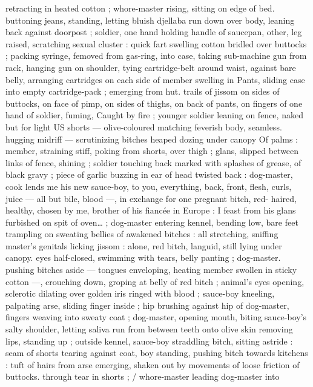 retracting in heated cotton ; whore-master rising, sitting on edge of 
bed. buttoning jeans, standing, letting bluish djellaba run down over 
body, leaning back against doorpost ; soldier, one hand holding 
handle of saucepan, other, leg raised, scratching sexual cluster : 
quick fart swelling cotton bridled over buttocks ; packing syringe, 
femoved from gas-ring, into case, taking sub-machine gun from rack, 
hanging gun on shoulder, tying cartridge-belt around waist, against 
bare belly, arranging cartridges on each side of member swelling in 
Pants, sliding case into empty cartridge-pack ; emerging from hut. 
trails of jissom on sides of buttocks, on face of pimp, on sides of 
thighs, on back of pants, on fingers of one hand of soldier, fuming, 
Caught by fire ; younger soldier leaning on fence, naked but for light 
US shorts --- olive-coloured matching feverish body, seamless. 
hugging midriff --- scrutinizing bitches heaped dozing under canopy 
Of palms : member, straining stiff, poking from shorts, over thigh ; 
glans, slipped between links of fence, shining ; soldier touching back 
marked with splashes of grease, of black gravy ; piece of garlic 
buzzing in ear of head twisted back : {\gl}{\td} dog-master, cook lends me 
his new sauce-boy, to you, everything, back, front, flesh, curls, juice 
--- all but bile, blood ---, in exchange for one pregnant bitch, red- 
haired, healthy, chosen by me, brother of his fiancée in Europe : I 
feast from his glans furbished on spit of oven{\ldots} {\gr} ; dog-master 
entering kennel, bending low, bare feet trampling on sweating bellies 
of awakened bitches : all stretching, sniffing master's genitals 
licking jissom : alone, red bitch, languid, still lying under canopy. 
eyes half-closed, swimming with tears, belly panting ; dog-master. 
pushing bitches aside --- tongues enveloping, heating member 
swollen in sticky cotton ---, crouching down, groping at belly of red 
bitch ; animal's eyes opening, sclerotic dilating over golden iris 
ringed with blood ; sauce-boy kneeling, palpating arse, sliding finger 
inside ; hip brushing against hip of dog-master, fingers weaving into 
sweaty coat ; dog-master, opening mouth, biting sauce-boy's salty 
shoulder, letting saliva run from between teeth onto olive skin 
removing lips, standing up ; outside kennel, sauce-boy straddling 
bitch, sitting astride : seam of shorts tearing against coat, boy 
standing, pushing bitch towards kitchens : tuft of hairs from arse 
emerging, shaken out by movements of loose friction of buttocks. 
through tear in shorts ; {\slash} whore-master leading dog-master into 
